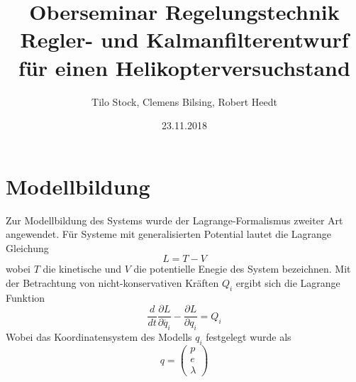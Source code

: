 \documentclass{article}
\title{Oberseminar Regelungstechnik \\ Regler- und Kalmanfilterentwurf für einen Helikopterversuchstand}
\author{Tilo Stock, Clemens Bilsing, Robert Heedt}
\date {23.11.2018}
\begin{document}
\maketitle
\tableofcontents
\newpage
\section{Modellbildung}
Zur Modellbildung des Systems wurde der Lagrange-Formalismus zweiter Art angewendet. Für Systeme mit generalisierten Potential lautet die Lagrange Gleichung 
\begin{equation}
L = T -V
\end{equation}
wobei $T$ die kinetische und $V$ die potentielle Enegie des System bezeichnen. Mit der Betrachtung von nicht-konservativen Kräften $Q_i$ ergibt sich die Lagrange Funktion
\begin{equation}\label{eq:lagrange}
\frac{d}{dt} \frac{\partial L}{\partial \dot{q_i}} - \frac{\partial L}{\partial q_i}=Q_i
\end{equation}
Wobei das Koordinatensystem des Modells $q_i$ festgelegt wurde als
\begin{equation}
q = \begin{pmatrix}
p\\e\\\lambda
\end{pmatrix}
\end{equation}
\end{document}
